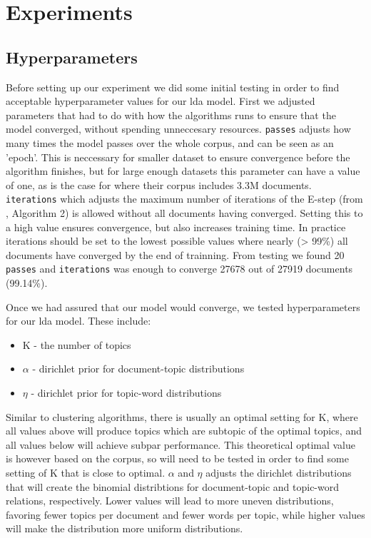 \section{Experiments}\label{sec:experiment}

\subsection{Hyperparameters}\label{subsec:hyperparameters}
Before setting up our experiment we did some initial testing in order to find acceptable hyperparameter values for our \gls{lda} model.
First we adjusted parameters that had to do with how the algorithms runs to ensure that the model converged, without spending unneccesary resources.
\texttt{passes} adjusts how many times the model passes over the whole corpus, and can be seen as an 'epoch'. This is neccessary for smaller dataset to ensure convergence before the algorithm finishes, but for large enough datasets this parameter can have a value of one, as is the case for \cite{online} where their corpus includes 3.3M documents.
\texttt{iterations} which adjusts the maximum number of iterations of the E-step (from \cite{}, Algorithm 2) is allowed without all documents having converged. Setting this to a high value ensures convergence, but also increases training time. In practice iterations should be set to the lowest possible values where nearly (> 99\%) all documents have converged by the end of trainning.
From testing we found 20 \texttt{passes} and \texttt{iterations} was enough to converge 27678 out of 27919 documents (99.14\%).

Once we had assured that our model would converge, we tested hyperparameters for our \gls{lda} model.
These include:
\begin{itemize}
	\item K - the number of topics
	\item $\alpha$ - dirichlet prior for document-topic distributions
	\item $\eta$ - dirichlet prior for topic-word distributions
\end{itemize}
Similar to clustering algorithms, there is usually an optimal setting for K, where all values above will produce topics which are subtopic of the optimal topics, and all values below will achieve subpar performance.
This theoretical optimal value is however based on the corpus, so will need to be tested in order to find some setting of K that is close to optimal.
$\alpha$ and $\eta$ adjusts the dirichlet distributions that will create the binomial distribtions for document-topic and topic-word relations, respectively.
Lower values will lead to more uneven distributions, favoring fewer topics per document and fewer words per topic, while higher values will make the distribution more uniform distributions.

